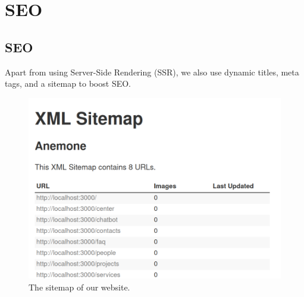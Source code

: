 
\section{SEO}
\subsection{SEO}
Apart from using Server-Side Rendering (SSR), we also use dynamic titles, meta tags, and a sitemap to boost SEO.
\begin{figure}[h]
	\centering
	\includegraphics[width=\linewidth]{Resources/sitemap.png}
	\caption{The sitemap of our website.}
	\label{fig:example}
\end{figure}